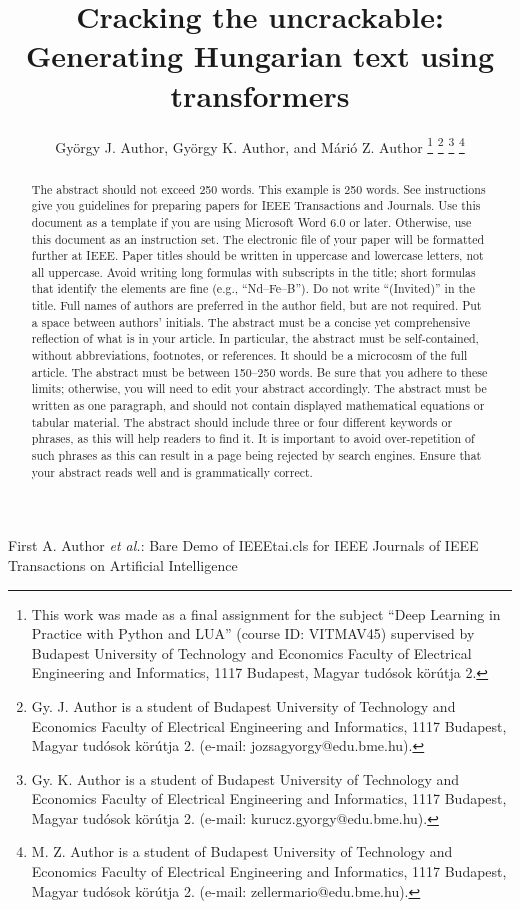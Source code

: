 \documentclass[journal]{IEEEtai}
\begin{document}
\title{ Cracking the uncrackable: Generating Hungarian text using transformers } 


\author{György J. Author, György K. Author, and Márió Z. Author
\thanks{This work was made as a final assignment for the subject ``Deep Learning in Practice with Python and LUA'' (course ID: VITMAV45) supervised by Budapest University of Technology and Economics Faculty of Electrical Engineering and Informatics, 1117 Budapest, Magyar tudósok körútja 2. }
\thanks{Gy. J. Author is a student of Budapest University of Technology and Economics Faculty of Electrical Engineering and Informatics, 1117 Budapest, Magyar tudósok körútja 2. (e-mail: jozsagyorgy@edu.bme.hu).}
\thanks{Gy. K. Author is a student of Budapest University of Technology and Economics Faculty of Electrical Engineering and Informatics, 1117 Budapest, Magyar tudósok körútja 2. (e-mail: kurucz.gyorgy@edu.bme.hu).}
\thanks{M. Z. Author is a student of Budapest University of Technology and Economics Faculty of Electrical Engineering and Informatics, 1117 Budapest, Magyar tudósok körútja 2. (e-mail: zellermario@edu.bme.hu).}}

{First A. Author \MakeLowercase{\textit{et al.}}: Bare Demo of IEEEtai.cls for IEEE Journals of IEEE Transactions on Artificial Intelligence}

\maketitle

\begin{abstract}
The abstract should not exceed 250 words. This example is 250 words. See instructions give you guidelines for preparing papers for IEEE Transactions and Journals. Use this document as a template if you are using Microsoft {\bi Word} 6.0 or later. Otherwise, use this document as an instruction set. The electronic file of your paper will be formatted further at IEEE. Paper titles should be written in uppercase and lowercase letters, not all uppercase. Avoid writing long formulas with subscripts in the title; short formulas that identify the elements are fine (e.g., ``Nd--Fe--B''). Do not write ``(Invited)'' in the title. Full names of authors are preferred in the author field, but are not required. Put a space between authors' initials. The abstract must be a concise yet comprehensive reflection of what is in your article. In particular, the abstract must be self-contained, without abbreviations, footnotes, or references. It should be a microcosm of the full article. The abstract must be between 150--250 words. Be sure that you adhere to these limits; otherwise, you will need to edit your abstract accordingly. The abstract must be written as one paragraph, and should not contain displayed mathematical equations or tabular material. The abstract should include three or four different keywords or phrases, as this will help readers to find it. It is important to avoid over-repetition of such phrases as this can result in a page being rejected by search engines. Ensure that your abstract reads well and is grammatically correct.
\end{abstract}
\end{document}
